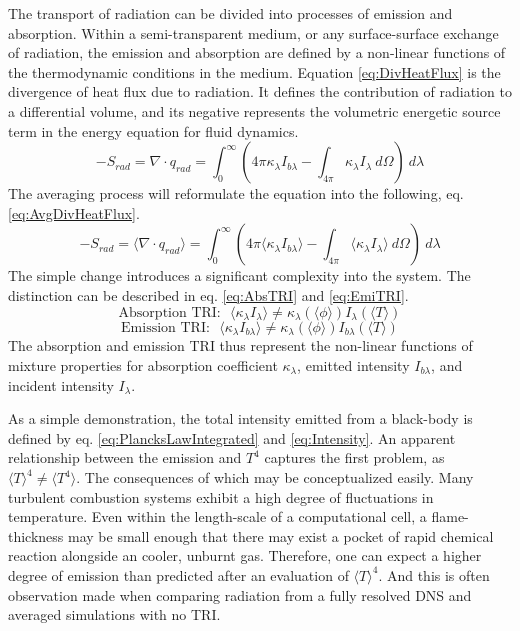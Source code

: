 The transport of radiation can be divided into processes of emission and absorption. 
Within a semi-transparent medium, or any surface-surface exchange of radiation, the emission and absorption are defined by a non-linear functions of the thermodynamic conditions in the medium.
Equation \ref{eq:DivHeatFlux} is the divergence of heat flux due to radiation. It defines the contribution of radiation to a differential volume, and its negative represents the volumetric energetic source term in the energy equation for fluid dynamics.
\begin{equation}
    -S_{rad}=\nabla\cdot{}q_{rad} = \int_0^\infty{\left(4\pi{}\kappa_\lambda{}I_{b\lambda{}}-\int_{4\pi}{\kappa{}_\lambda{}I_\lambda{}~d\Omega{}}\right)~d\lambda{}}
    \label{eq:DivHeatFlux}
\end{equation}
The averaging process will reformulate the equation into the following, eq. \ref{eq:AvgDivHeatFlux}.
\begin{equation}
    -S_{rad}=\langle\nabla\cdot{}q_{rad}\rangle = \int_0^\infty{\left(4\pi{}\langle\kappa_\lambda{}I_{b\lambda{}}\rangle-\int_{4\pi}{\langle\kappa{}_\lambda{}I_\lambda{}\rangle~d\Omega{}}\right)~d\lambda{}}
    \label{eq:AvgDivHeatFlux}
\end{equation}
The simple change introduces a significant complexity into the system. The distinction can be described in eq. \ref{eq:AbsTRI} and \ref{eq:EmiTRI}.
\begin{equation}
    \text{Absorption TRI:~~}\langle\kappa_\lambda{}I_{\lambda}\rangle \neq \kappa_\lambda{}(\langle\phi{}\rangle) I_{\lambda}(\langle{}T\rangle{})
    \label{eq:AbsTRI}
\end{equation}
\begin{equation}
    \text{Emission TRI:~~}\langle\kappa_\lambda{}I_{b\lambda}\rangle \neq \kappa_\lambda{}(\langle\phi{}\rangle) I_{b\lambda}(\langle{}T\rangle{})
    \label{eq:EmiTRI}
\end{equation}
The absorption and emission TRI thus represent the non-linear functions of mixture properties for absorption coefficient $\kappa_\lambda$, emitted intensity $I_{b\lambda}$, and incident intensity $I_\lambda$.


As a simple demonstration, the total intensity emitted from a black-body is defined by eq. \ref{eq:PlancksLawIntegrated} and \ref{eq:Intensity}.
An apparent relationship between the emission and $T^4$ captures the first problem, as $\langle{T}\rangle^4 \neq \langle{}T^4\rangle$. 
The consequences of which may be conceptualized easily. Many turbulent combustion systems exhibit a high degree of fluctuations in temperature. Even within the length-scale of a computational cell, a flame-thickness may be small enough that there may exist a pocket of rapid chemical reaction alongside an cooler, unburnt gas.
Therefore, one can expect a higher degree of emission than predicted after an evaluation of $\langle{T}\rangle^4$. And this is often observation made when comparing radiation from a fully resolved DNS and averaged simulations with no TRI.

